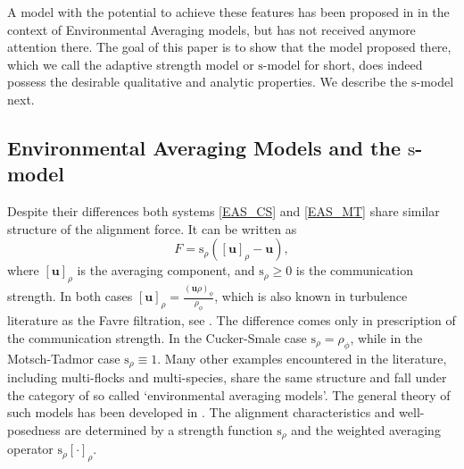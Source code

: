 \documentclass[11pt,letterpaper]{amsart}
\theoremstyle{plain}
\theoremstyle{definition}
\theoremstyle{remark}
\newcommand{\ave}[1]{ \left[ #1 \right]}
\renewcommand{\geq}{\geqslant}
\def\u{\textbf{u}}
\def \st {\mathrm{s}}
\begin{document}
A model with the potential to achieve these features has been proposed in \cite{shvydkoy2022environmental} in the context of Environmental Averaging models, but 
has not received anymore attention there.  The goal of this paper is to show that the model proposed there, which we call the adaptive strength model or $\st$-model for short, does indeed possess the desirable qualitative and analytic properties.  We describe the $\st$-model next. 

\subsection{Environmental Averaging Models and the $\st$-model}

Despite their differences both systems \eqref{EAS_CS} and  \eqref{EAS_MT} share similar structure of the alignment force. It can be written as 
\begin{equation}\label{e:F}
F = \st_\rho ( \ave{\u}_\rho - \u),
\end{equation}
where $\ave{\u}_\rho$ is the averaging component, and $\st_\rho \geq 0$ is the communication strength. In both cases $\ave{\u}_\rho= \frac{(\u \rho)_\phi}{\rho_\phi}$, which  is also known in turbulence literature as the Favre filtration, see \cite{Favre}. 
The difference comes only in prescription of the communication strength. 
In the Cucker-Smale case $\st_\rho = \rho_\phi$, while in the Motsch-Tadmor case $\st_\rho \equiv 1$. Many other examples encountered in the literature, including multi-flocks and multi-species, share the same structure and fall under the category of so called `environmental averaging models'. The general theory of such models has been developed in \cite{shvydkoy2022environmental}. 
The alignment characteristics and well-posedness are determined by 
a strength function $\st_{\rho}$ and the weighted averaging operator $\st_\rho [\cdot]_{\rho}$. 
\end{document}
